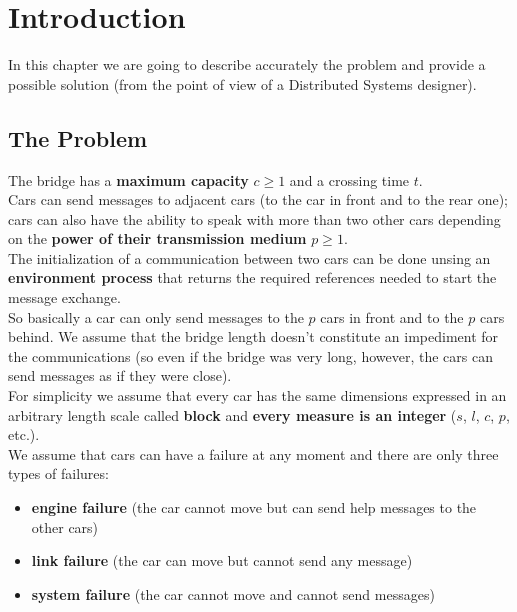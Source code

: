 \chapter{Introduction}\label{ch:intro}

In this chapter we are going to describe accurately the problem and provide a possible 
solution (from the point of view of a Distributed Systems designer).\\


\section{The Problem}

The bridge has a \textbf{maximum capacity} $c \geq 1$ and a crossing time $t$. \\


Cars can send messages to adjacent cars (to the car in front and to the rear one); 
cars can also have the ability to speak with more than two other cars depending on the 
\textbf{power of their transmission medium} $p \geq 1$.\\

The initialization of a communication between two cars can be done unsing an 
\textbf{environment process} 
that returns the required references needed to start the message exchange.\\

So basically a car can only send messages to the $p$ cars in front and 
to the $p$ cars behind. We assume that the bridge length doesn't constitute an impediment 
for the communications (so even if the bridge was very long, however, 
the cars can send messages as if they were close).\\

For simplicity we assume that every car has the 
same dimensions expressed in an arbitrary length scale called \textbf{block} and 
\textbf{every measure is an integer} ($s$, $l$, $c$, $p$, etc.). \\

We assume that cars can have a failure at any moment and there are only 
three types of failures:
\begin{itemize}
    \item \textbf{engine failure} (the car cannot move but can send help messages to the other cars)
    \item \textbf{link failure} (the car can move but cannot send any message)
    \item \textbf{system failure} (the car cannot move and cannot send messages)
\end{itemize}

